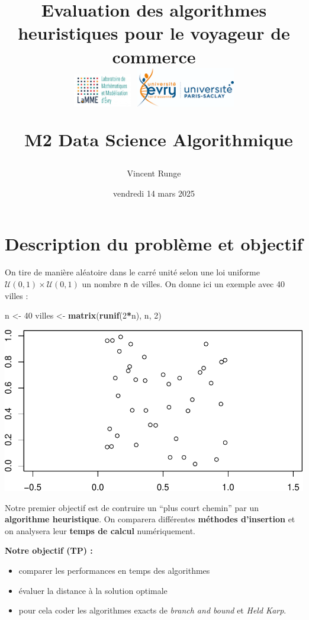\documentclass[
]{article}
\title{Evaluation des algorithmes heuristiques pour le voyageur de
commerce\\
\includegraphics[width=1in,height=\textheight]{Images/logo_lamme.png}
\includegraphics[width=1.7in,height=\textheight]{Images/logo_UEVE.png}\\
\strut ~M2 Data Science Algorithmique}
\author{Vincent Runge}
\date{vendredi 14 mars 2025}
\newenvironment{Shaded}{\begin{snugshade}}{\end{snugshade}}
\newcommand{\DecValTok}[1]{\textcolor[rgb]{0.00,0.00,0.81}{#1}}
\newcommand{\FunctionTok}[1]{\textcolor[rgb]{0.13,0.29,0.53}{\textbf{#1}}}
\newcommand{\NormalTok}[1]{#1}
\newcommand{\OtherTok}[1]{\textcolor[rgb]{0.56,0.35,0.01}{#1}}
\newcommand{\SpecialCharTok}[1]{\textcolor[rgb]{0.81,0.36,0.00}{\textbf{#1}}}
\begin{document}
\maketitle

{
\hypersetup{linkcolor=}
\setcounter{tocdepth}{2}
\tableofcontents
}
\noindent\hrulefill

\section{Description du problème et
objectif}\label{description-du-probluxe8me-et-objectif}

On tire de manière aléatoire dans le carré unité selon une loi uniforme
\(\mathcal{U}(0,1) \times \mathcal{U}(0,1)\) un nombre \texttt{n} de
villes. On donne ici un exemple avec 40 villes :

\begin{Shaded}
\begin{Highlighting}[]
\NormalTok{n }\OtherTok{\textless{}{-}} \DecValTok{40}
\NormalTok{villes }\OtherTok{\textless{}{-}} \FunctionTok{matrix}\NormalTok{(}\FunctionTok{runif}\NormalTok{(}\DecValTok{2}\SpecialCharTok{*}\NormalTok{n), n, }\DecValTok{2}\NormalTok{)}
\end{Highlighting}
\end{Shaded}

\includegraphics{TSP_analyse_files/figure-latex/unnamed-chunk-2-1.pdf}

Notre premier objectif est de contruire un ``plus court chemin'' par un
\textbf{algorithme heuristique}. On comparera différentes
\textbf{méthodes d'insertion} et on analysera leur \textbf{temps de
calcul} numériquement.

\textbf{Notre objectif (TP) : }

\begin{itemize}
\item
  comparer les performances en temps des algorithmes
\item
  évaluer la distance à la solution optimale
\item
  pour cela coder les algorithmes exacts de \emph{branch and bound} et
  \emph{Held Karp}.
\end{itemize}
\end{document}
